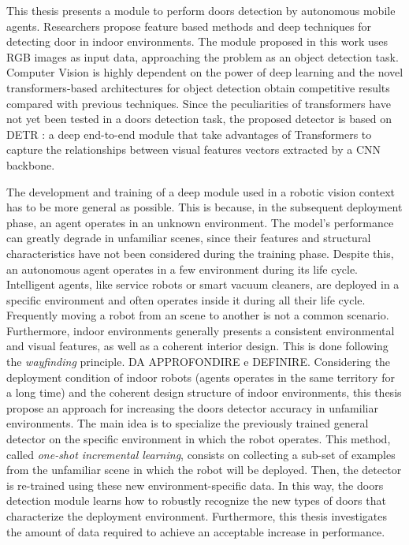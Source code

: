 This thesis presents a module to perform doors detection by autonomous mobile agents. Researchers propose feature based methods \cite{sonarandivisualdoordetection, humanoid, edgeandcornerdoorsdetector} and deep techniques \cite{detectdoorsfeature, doorsandnavigation, doorcabinet} for detecting door in indoor environments.  The module proposed in this work uses RGB images as input data, approaching the problem as an object detection task. Computer Vision is highly dependent on the power of deep learning and the novel transformers-based architectures for object detection obtain competitive results compared with previous techniques. Since the peculiarities of transformers have not yet been tested in a doors detection task, the proposed detector is based on DETR \cite{detr}: a deep end-to-end module that take advantages of Transformers to capture the relationships between visual features vectors extracted by a CNN backbone. 

The development and training of a deep module used in a robotic vision context has to be more general as possible. This is because, in the subsequent deployment phase, an agent operates in an unknown environment. The model's performance can greatly degrade in unfamiliar scenes, since their features and structural characteristics have not been considered during the training phase. Despite this, an autonomous agent operates in a few environment during its life cycle. Intelligent agents, like service robots or smart vacuum cleaners, are deployed in a specific environment and often operates inside it during all their life cycle. Frequently moving a robot from an scene to another is not a common scenario. Furthermore, indoor environments generally presents a consistent environmental and visual features, as well as a coherent interior design. This is done following the \textit{wayfinding} principle. DA APPROFONDIRE e DEFINIRE. Considering the deployment condition of indoor robots (agents operates in the same territory for a long time) and the coherent design structure of indoor environments, this thesis propose an approach for increasing the doors detector accuracy in unfamiliar environments. The main idea is to specialize the previously trained general detector on the specific environment in which the robot operates. This method, called \textit{one-shot incremental learning}, consists on collecting a sub-set of examples from the unfamiliar scene in which the robot will be deployed. Then, the detector is re-trained using these new environment-specific data. In this way, the doors detection module learns how to robustly recognize the new types of doors that characterize the deployment environment. Furthermore, this thesis investigates the amount of data required to achieve an acceptable increase in performance.

